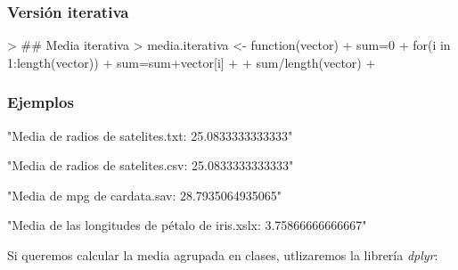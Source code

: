 \documentclass [a4paper] {article}
\begin{document}
\subsubsection{Versión iterativa}
\begin{Schunk}
\begin{Sinput}
> ## Media iterativa
> media.iterativa <- function(vector){
+ 	sum=0
+ 	for(i in 1:length(vector)){
+ 		sum=sum+vector[i]
+ 	}
+ 	sum/length(vector)
+ }
\end{Sinput}
\end{Schunk}
\subsubsection{Ejemplos}
\begin{Schunk}
\begin{Soutput}
[1] "Media de radios de satelites.txt:  25.0833333333333"
\end{Soutput}
\begin{Soutput}
[1] "Media de radios de satelites.csv:  25.0833333333333"
\end{Soutput}
\begin{Soutput}
[1] "Media de mpg de cardata.sav:  28.7935064935065"
\end{Soutput}
\begin{Soutput}
[1] "Media de las longitudes de pétalo de iris.xslx:  3.75866666666667"
\end{Soutput}
\end{Schunk}

Si queremos calcular la media agrupada en clases, utlizaremos la librería \textit{dplyr}:
\end{document}
